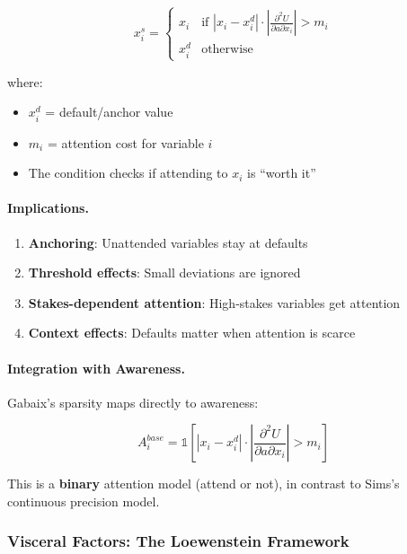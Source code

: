 \begin{equation}
x^s_i = 
\begin{cases}
x_i & \text{if } |x_i - x^d_i| \cdot \left|\frac{\partial^2 U}{\partial a \partial x_i}\right| > m_i \\
x^d_i & \text{otherwise}
\end{cases}
\end{equation}

where:
\begin{itemize}
\item $x^d_i$ = default/anchor value
\item $m_i$ = attention cost for variable $i$
\item The condition checks if attending to $x_i$ is ``worth it''
\end{itemize}

\paragraph{Implications.}
\begin{enumerate}
\item \textbf{Anchoring}: Unattended variables stay at defaults
\item \textbf{Threshold effects}: Small deviations are ignored
\item \textbf{Stakes-dependent attention}: High-stakes variables get attention
\item \textbf{Context effects}: Defaults matter when attention is scarce
\end{enumerate}

\paragraph{Integration with Awareness.}
Gabaix's sparsity maps directly to awareness:

\begin{equation}
A^{base}_i = \mathbb{1}\left[|x_i - x^d_i| \cdot \left|\frac{\partial^2 U}{\partial a \partial x_i}\right| > m_i\right]
\end{equation}

This is a \textbf{binary} attention model (attend or not), in contrast to 
Sims's continuous precision model.

\subsubsection{Visceral Factors: The Loewenstein Framework}
\label{subsubsec:visceral-factors}

